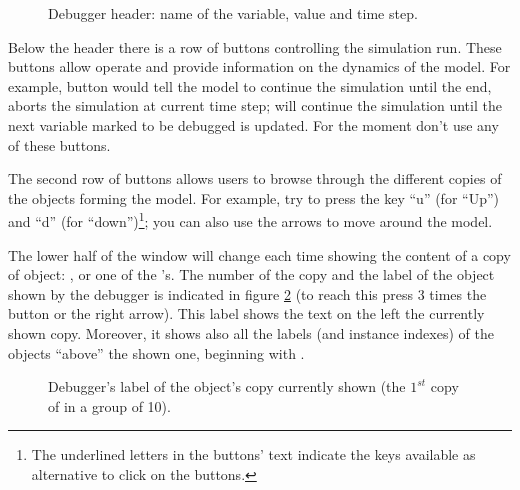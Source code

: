 \documentclass [11pt,a4paper] {book}
\begin{document}
\begin{figure}[ht]
  \centering
  \caption{Debugger header: name of the variable, value and time step.}
  \label{fig:debheader}
\end{figure}

Below the header there is a row of buttons controlling the simulation run. These
buttons allow operate and provide information on the dynamics of the model. For example,
button  would tell the model to continue the simulation until the end,
 aborts the simulation at current time step;  will continue the simulation until the next variable marked to be debugged is updated. For the moment don't use any of
these buttons.

The second row of buttons allows users to browse through the different copies of the
objects forming the model. For example, try to press the key ``u'' (for ``Up'') and ``d''
(for ``down'')\footnote{The underlined letters in the buttons' text indicate the keys
available as alternative to click on the buttons.}; you can also use the arrows to move around the model.

 The lower half of the window will
change each time showing the content of a copy of object: , 
 or one of the 's. The number of the copy and the
label of the object shown by the debugger is indicated in figure \ref{fig:debcopy} (to
reach this press 3 times the button  or the right arrow). This label shows the text  on the left the currently shown copy. Moreover, it shows also
all the labels (and instance indexes) of the objects ``above'' the shown one, beginning
with .

\begin{figure}[ht]
  \centering
  \caption{Debugger's label of the object's copy currently shown (the $1^{st}$ copy of  in a group of 10).}
  \label{fig:debcopy}
\end{figure}
\end{document}
